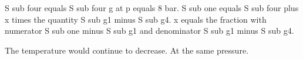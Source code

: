 S sub four equals S sub four g at p equals 8 bar. S sub one equals S sub four plus x times the quantity S sub g1 minus S sub g4. x equals the fraction with numerator S sub one minus S sub g1 and denominator S sub g1 minus S sub g4.

The temperature would continue to decrease. At the same pressure.